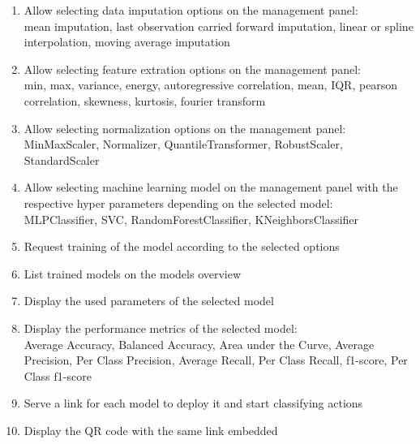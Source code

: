 \begin{enumerate}[{label = \textbf{/F{\protect\twodigits{\arabic{enumi}}}0/}, leftmargin = *}]
    \item Allow selecting data imputation options on the management panel: \\mean imputation, last observation carried forward imputation, linear or spline interpolation, moving average imputation
    \item Allow selecting feature extration options on the management panel: \\min, max, variance, energy, autoregressive correlation, mean, IQR, pearson correlation, skewness, kurtosis, fourier transform
    \item Allow selecting normalization options on the management panel: \\MinMaxScaler, Normalizer, QuantileTransformer, RobustScaler, StandardScaler
    \item Allow selecting machine learning model on the management panel with the respective hyper parameters depending on the selected model: \\MLPClassifier, SVC, RandomForestClassifier, KNeighborsClassifier
    \item Request training of the model according to the selected options
    \item List trained models on the models overview
    \item Display the used parameters of the selected model
    \item Display the performance metrics of the selected model: \\Average Accuracy, Balanced Accuracy, Area under the Curve, Average Precision, Per Class Precision, Average Recall, Per Class Recall, f1-score, Per Class f1-score
    \item Serve a link for each model to deploy it and start classifying actions
    \item Display the QR code with the same link embedded
\end{enumerate}

